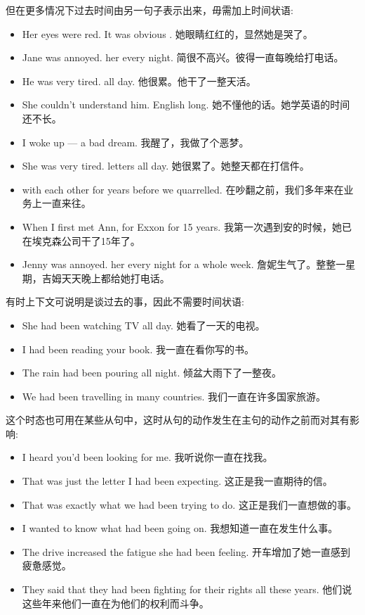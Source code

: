 但在更多情况下过去时间由另一句子表示出来，毋需加上时间状语:
\begin{itemize}
  \itemsep0em
  \item Her eyes were red. It was obvious . 她眼睛红红的，显然她是哭了。
  \item Jane was annoyed.  her every night. 简很不高兴。彼得一直每晚给打电话。
  \item He was very tired.  all day. 他很累。他干了一整天活。
  \item She couldn’t understand him.  English long. 她不懂他的话。她学英语的时间还不长。
  \item I woke up —  a bad dream. 我醒了，我做了个恶梦。
  \item She was very tired.  letters all day. 她很累了。她整天都在打信件。
  \item {} with each other for years before we quarrelled. 在吵翻之前，我们多年来在业务上一直来往。
  \item When I first met Ann,  for Exxon for 15 years. 我第一次遇到安的时候，她已在埃克森公司干了15年了。
  \item Jenny was annoyed.  her every night for a whole week. 詹妮生气了。整整一星期，吉姆天天晚上都给她打电话。
\end{itemize}

有时上下文可说明是谈过去的事，因此不需要时间状语:
\begin{itemize}
  \itemsep0em
  \item She had been watching TV all day. 她看了一天的电视。
  \item I had been reading your book. 我一直在看你写的书。
  \item The rain had been pouring all night. 倾盆大雨下了一整夜。
  \item We had been travelling in many countries. 我们一直在许多国家旅游。
\end{itemize}

这个时态也可用在某些从句中，这时从句的动作发生在主句的动作之前而对其有影响:
\begin{itemize}
  \itemsep0em
  \item I heard you’d been looking for me. 我听说你一直在找我。
  \item That was just the letter I had been expecting. 这正是我一直期待的信。
  \item That was exactly what we had been trying to do. 这正是我们一直想做的事。
  \item I wanted to know what had been going on. 我想知道一直在发生什么事。
  \item The drive increased the fatigue she had been feeling. 开车增加了她一直感到疲惫感觉。
  \item They said that they had been fighting for their rights all these years. 他们说这些年来他们一直在为他们的权利而斗争。
\end{itemize}


